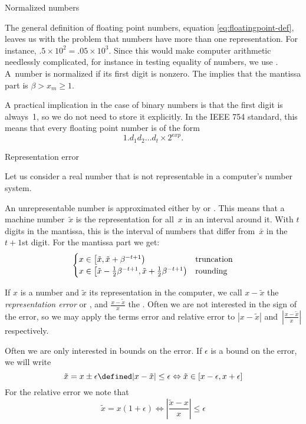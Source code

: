  {Normalized numbers}

The general definition of floating point numbers,
equation \eqref{eq:floatingpoint-def}, leaves us with the problem that numbers
have more than one representation. For instance,
$.5\times10^{2}=.05\times 10^3$. Since this would make computer
arithmetic needlessly complicated, for instance in testing equality of
numbers, we use . A~number is normalized if its first digit is nonzero.
The implies that the mantissa part is $\beta> x_m\geq 1$.

A practical implication in the case of binary numbers is that the
first digit is always~1, so we do not need to store it explicitly.
In the IEEE 754 standard, this means that every floating point number
is of the form
\[ 1.d_1d_2\ldots d_t\times 2^{\mathrm exp}.\]

 {Representation error}

Let us consider a real number that is not representable in a
computer's number system.

An unrepresentable number is approximated either by
 or .
This means that a machine number~$\tilde x$ is the representation for
all~$x$ in an interval around it.  With $t$ digits in the
mantissa, this is the interval of numbers that differ
from~$\bar x$ in the $t+1$st digit. For the mantissa
part we get:
\[
\begin{cases}
  x\in \left[\tilde x,\tilde x+\beta^{-t+1}\right)&\hbox{truncation}\\
  x\in \left[\tilde x-\frac12 \beta^{-t+1},\tilde x+\frac12 \beta^{-t+1}\right)
    &\hbox{rounding}
\end{cases}
\]

If $x$ is a number and $\tilde x$ its representation in the computer,
we call $x-\tilde x$ the \emph{representation error} or
, and $\frac{x-\tilde x}{x}$
the . Often we are not
interested in the sign of the error, so we may apply the terms error
and relative error to $|x-\tilde x|$ and~$|\frac{x-\tilde x}{x}|$
respectively.

Often we are only interested in bounds on the error. If $\epsilon$ is
a bound on the error, we will write
\[ \tilde x = x\pm\epsilon \defined
    |x-\tilde x|\leq\epsilon 
    \Leftrightarrow \tilde x\in[x-\epsilon,x+\epsilon]
\]
For the relative error we note that
\[ \tilde x =x(1+\epsilon) \Leftrightarrow
    \left|\frac{\tilde x-x}{x}\right|\leq \epsilon
\]

